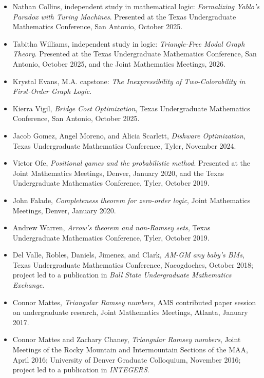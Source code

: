 \documentclass[10pt,letterpaper]{article}
\begin{document}
\begin{itemize}
\item Nathan Collins, independent study in mathematical logic: \emph{Formalizing Yablo's Paradox with Turing Machines}. Presented at the Texas Undergraduate Mathematics Conference, San Antonio, October 2025.
\item Tabitha Williams, independent study in logic: \emph{Triangle-Free Modal Graph Theory}. Presented at the Texas Undergraduate Mathematics Conference, San Antonio, October 2025, and the Joint Mathematics Meetings, 2026.
\item Krystal Evans, M.A. capstone: \emph{The Inexpressibility of Two-Colorability in First-Order Graph Logic}.
\item Kierra Vigil, \emph{Bridge Cost Optimization}, Texas Undergraduate Mathematics Conference, San Antonio, October 2025.
\item Jacob Gomez, Angel Moreno, and Alicia Scarlett, \emph{Dishware Optimization}, Texas Undergraduate Mathematics Conference, Tyler, November 2024.
\item Victor Ofe, \emph{Positional games and the probabilistic method}. Presented at the Joint Mathematics Meetings, Denver, January 2020, and the Texas Undergraduate Mathematics Conference, Tyler, October 2019.
\item John Falade, \emph{Completeness theorem for zero-order logic}, Joint Mathematics Meetings, Denver, January 2020.
\item Andrew Warren, \emph{Arrow's theorem and non-Ramsey sets}, Texas Undergraduate Mathematics Conference, Tyler, October 2019.
\item Del Valle, Robles, Daniels, Jimenez, and Clark, \emph{AM-GM any baby's BMs}, Texas Undergraduate Mathematics Conference, Nacogdoches, October 2018; project led to a publication in \emph{Ball State Undergraduate Mathematics Exchange}.
\item Connor Mattes, \emph{Triangular Ramsey numbers}, AMS contributed paper session on undergraduate research, Joint Mathematics Meetings, Atlanta, January 2017.
\item Connor Mattes and Zachary Chaney, \emph{Triangular Ramsey numbers}, Joint Meetings of the Rocky Mountain and Intermountain Sections of the MAA, April 2016; University of Denver Graduate Colloquium, November 2016; project led to a publication in \emph{INTEGERS}.
\end{itemize}
\end{document}
